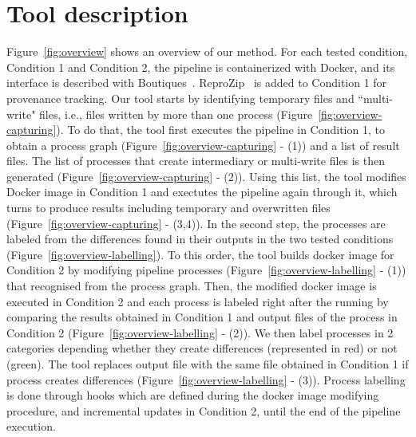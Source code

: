 \documentclass[a4paper,num-refs]{oup-contemporary}
\newcommand{\reprozip}[0]{ReproZip\xspace}
\begin{document}



\section{Tool description}

Figure~\ref{fig:overview} shows an overview of our method. For each tested
condition, Condition 1 and Condition 2, the pipeline is containerized with
Docker, and its interface is described with
Boutiques~\cite{glatard2017boutiques}. \reprozip~\cite{chirigati2016reprozip} is
added to Condition 1 for provenance tracking. Our tool starts by
identifying temporary files and ``multi-write" files, i.e., files written
by more than one process (Figure~\ref{fig:overview-capturing}). To do that,
the tool first executes the pipeline in Condition 1, to obtain a process
graph (Figure~\ref{fig:overview-capturing} - (1)) and a list of result files.
The list of processes that create intermediary or multi-write
files is then generated (Figure~\ref{fig:overview-capturing} - (2)). 
Using this list, the tool modifies Docker image in Condition 1 and
exectutes the pipeline again through it, which turns to produce results
including temporary and overwritten files
(Figure~\ref{fig:overview-capturing} - (3,4)). In the second step, the
processes are labeled from the differences found in their outputs in the
two tested conditions (Figure~\ref{fig:overview-labelling}). To this order,
the tool builds docker image for Condition 2 by modifying pipeline
processes (Figure~\ref{fig:overview-labelling} - (1)) that recognised from 
the process graph. Then, the modified docker
image is executed in Condition 2 and each process is labeled right after
the running by comparing the results obtained in Condition 1
and output files of the process in Condition 2
(Figure~\ref{fig:overview-labelling} - (2)). We then label processes in 2
categories depending whether they
create differences (represented in red) or not (green). 
The tool replaces output file with the same file obtained in Condition 1 
if process creates differences (Figure~\ref{fig:overview-labelling} - (3)).
Process labelling
is done through hooks which are defined during the docker image modifying
procedure, and incremental updates in Condition 2, until the end of the
pipeline execution.
\end{document}
